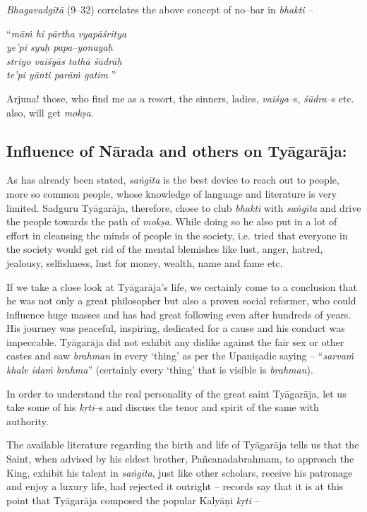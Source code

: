 \textit{Bhagavadgītā} (9–32) correlates the above concept of no–bar in \textit{bhakti} –

\begin{myquote}
“\textit{māṁ hi pārtha vyapāśritya}\\\textit{ye’pi syuḥ papa–yonayaḥ }\\\textit{striyo vaiśyās tathā śūdrāḥ} \\\textit{te’pi yānti parāṁ gatim }”
\end{myquote}

Arjuna! those, who find me as a resort, the sinners, ladies, \textit{vaiśya}–s, \textit{śūdra}–s etc. also, will get \textit{mokṣa}.


\subsection*{Influence of Nārada and others on Tyāgarāja:}

\vspace{-.3cm}

As has already been stated, \textit{saṅgīta} is the best device to reach out to people, more so common people, whose knowledge of language and literature is very limited. Sadguru Tyāgarāja, therefore, chose to club \textit{bhakti} with \textit{saṅgīta} and drive the people towards the path of \textit{mokṣa}. While doing so he also put in a lot of effort in cleansing the minds of people in the society, i.e. tried that everyone in the society would get rid of the mental blemishes like lust, anger, hatred, jealousy, selfishness, lust for money, wealth, name and fame etc. 

If we take a close look at Tyāgarāja’s life, we certainly come to a conclusion that he was not only a great philosopher but also a proven social reformer, who could influence huge masses and has had great following even after hundreds of years. His journey was peaceful, inspiring, dedicated for a cause and his conduct was impeccable. Tyāgarāja did not exhibit any dislike against the fair sex or other castes and saw \textit{brahman} in every ‘thing’ as per the Upaniṣadic saying – “\textit{sarvaṁ khalv idaṁ brahma}” (certainly every ‘thing’ that is visible is \textit{brahman}).

In order to understand the real personality of the great saint Tyāgarāja, let us take some of his \textit{kṛti}–s and discuss the tenor and spirit of the same with authority.

The available literature regarding the birth and life of Tyāgarāja tells us that the Saint, when advised by his eldest brother, Pañcanadabrahmam, to approach the King, exhibit his talent in \textit{saṅgīta}, just like other scholars, receive his patronage and enjoy a luxury life, had rejected it outright – records say that it is at this point that Tyāgarāja composed the popular Kalyāṇi \textit{kṛti} –

